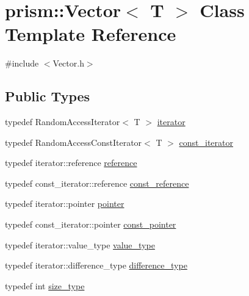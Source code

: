 \hypertarget{classprism_1_1_vector}{}\section{prism\+:\+:Vector$<$ T $>$ Class Template Reference}
\label{classprism_1_1_vector}


{\ttfamily \#include $<$Vector.\+h$>$}

\subsection*{Public Types}
\begin{DoxyCompactItemize}
\item 
typedef Random\+Access\+Iterator$<$ T $>$ \hyperlink{classprism_1_1_vector_aa547779173a63f6f8c9b2887498d10eb}{iterator}
\item 
typedef Random\+Access\+Const\+Iterator$<$ T $>$ \hyperlink{classprism_1_1_vector_acc6ed07e2d7ed5065feec92a83e46fa4}{const\+\_\+iterator}
\item 
typedef iterator\+::reference \hyperlink{classprism_1_1_vector_a8ccf98342707efbed82918a44be97438}{reference}
\item 
typedef const\+\_\+iterator\+::reference \hyperlink{classprism_1_1_vector_a75325487acaa0f63496c110e5a5632bb}{const\+\_\+reference}
\item 
typedef iterator\+::pointer \hyperlink{classprism_1_1_vector_a9823d64f361cdff3fcc5043e8b4bd882}{pointer}
\item 
typedef const\+\_\+iterator\+::pointer \hyperlink{classprism_1_1_vector_a0bf16322f83f0ad9103815a1cac16156}{const\+\_\+pointer}
\item 
typedef iterator\+::value\+\_\+type \hyperlink{classprism_1_1_vector_a12f8585af6daa44e7732880b3f725ee3}{value\+\_\+type}
\item 
typedef iterator\+::difference\+\_\+type \hyperlink{classprism_1_1_vector_a5fe3b74bfb30d75aa74d4d896e6b7227}{difference\+\_\+type}
\item 
typedef int \hyperlink{classprism_1_1_vector_a14c909f500f13b8b7a276bb97ae746e8}{size\+\_\+type}
\end{DoxyCompactItemize}
